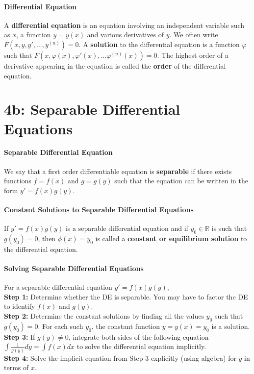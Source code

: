 \documentclass[10pt,letter]{article}
\begin{document}
\paragraph{Differential Equation} 
A \textbf{differential equation} is an equation involving an independent variable such as $x$, a function $y=y(x)$ and various derivatives of $y$. We often write $F(x,y,y',\ldots,y^{(n)})=0$. A \textbf{solution} to the differential equation is a function $\varphi$ such that $F(x,\varphi(x),\varphi'(x),\ldots\varphi^{(n)}(x))=0$. The highest order of a derivative appearing in the equation is called the \textbf{order} of the differential equation. 

\section*{4b: Separable Differential Equations}
\paragraph{Separable Differential Equation} 
We say that a first order differentiable equation is \textbf{separable} if there exists functions $f=f(x)$ and $g=g(y)$ such that the equation can be written in the form $y'=f(x)g(y)$. 
\paragraph{Constant Solutions to Separable Differential Equations}
If $y'=f(x)g(y)$ is a separable differential equation and if $y_0\in\mathbb{R}$ is such that $g(y_0)=0$, then $\phi(x)=y_0$ is called a \textbf{constant or equilibrium solution} to the differential equation. 
\paragraph{Solving Separable Differential Equations}
For a separable differential equation $y'=f(x)g(y)$, \\ 
\textbf{Step 1:} Determine whether the DE is separable. You may have to factor the DE to identify $f(x)$ and $g(y)$. \\
\textbf{Step 2:} Determine the constant solutions by finding all the values $y_0$ such that $g(y_0)=0$. For each such $y_0$, the constant function $y=y(x)=y_0$ is a solution. \\ 
\textbf{Step 3:} If $g(y)\neq0$, integrate both sides of the following equation $\int\frac{1}{g(y)}dy=\int f(x)dx$ to solve the differential equation implicitly. \\ 
\textbf{Step 4:} Solve the implicit equation from Step 3 explicitly (using algebra) for $y$ in terms of $x$. 
\end{document}
